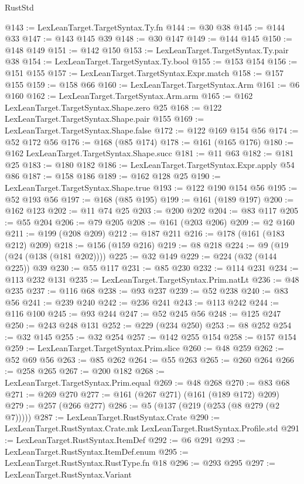 \begin{lexlean}{RustStd}
\begin{coremodule}
@143 := LexLeanTarget.TargetSyntax.Ty.fn
@144 := @30 @38
@145 := @144 @33
@147 := @143 @145 @39
@148 := @30 @147
@149 := @144 @145
@150 := @148 @149
@151 := @142 @150
@153 := LexLeanTarget.TargetSyntax.Ty.pair @38
@154 := LexLeanTarget.TargetSyntax.Ty.bool
@155 := @153 @154
@156 := @151 @155
@157 := LexLeanTarget.TargetSyntax.Expr.match
@158 := @157 @155
@159 := @158 @66
@160 := LexLeanTarget.TargetSyntax.Arm
@161 := @6 @160
@162 := LexLeanTarget.TargetSyntax.Arm.arm
@165 := @162 LexLeanTarget.TargetSyntax.Shape.zero @25
@168 := @122 LexLeanTarget.TargetSyntax.Shape.pair @155
@169 := LexLeanTarget.TargetSyntax.Shape.false
@172 := @122 @169 @154 @56
@174 := @52 @172 @56
@176 := @168 (@85 @174)
@178 := @161 (@165 @176)
@180 := @162 LexLeanTarget.TargetSyntax.Shape.succ
@181 := @11 @63
@182 := @181 @25
@183 := @180 @182
@186 := LexLeanTarget.TargetSyntax.Expr.apply @54 @86
@187 := @158 @186
@189 := @162 @128 @25
@190 := LexLeanTarget.TargetSyntax.Shape.true
@193 := @122 @190 @154 @56
@195 := @52 @193 @56
@197 := @168 (@85 @195)
@199 := @161 (@189 @197)
@200 := @162 @123
@202 := @11 @74 @25
@203 := @200 @202
@204 := @83 @117
@205 := @55 @204
@206 := @79 @205
@208 := @161 (@203 @206)
@209 := @2 @160
@211 := @199 (@208 @209)
@212 := @187 @211
@216 := @178 (@161 (@183 @212) @209)
@218 := @156 (@159 @216)
@219 := @8 @218
@224 := @9 (@19 (@24 (@138 (@181 @202))))
@225 := @32 @149
@229 := @224 (@32 (@144 @225)) @39
@230 := @55 @117
@231 := @85 @230
@232 := @114 @231
@234 := @113 @232 @131
@235 := LexLeanTarget.TargetSyntax.Prim.natLt
@236 := @48 @235
@237 := @116 @68
@238 := @93 @237
@239 := @52 @238
@240 := @83 @56
@241 := @239 @240
@242 := @236 @241
@243 := @113 @242
@244 := @116 @100
@245 := @93 @244
@247 := @52 @245 @56
@248 := @125 @247
@250 := @243 @248 @131
@252 := @229 (@234 @250)
@253 := @8 @252
@254 := @32 @145
@255 := @32 @254
@257 := @142 @255 @154
@258 := @157 @154
@259 := LexLeanTarget.TargetSyntax.Prim.slice
@260 := @48 @259
@262 := @52 @69 @56
@263 := @85 @262
@264 := @55 @263
@265 := @260 @264
@266 := @258 @265
@267 := @200 @182
@268 := LexLeanTarget.TargetSyntax.Prim.equal
@269 := @48 @268
@270 := @83 @68
@271 := @269 @270
@277 := @161 (@267 @271) (@161 (@189 @172) @209)
@279 := @257 (@266 @277)
@286 := @5 (@137 (@219 (@253 (@8 @279 (@2 @7)))))
@287 := LexLeanTarget.RustSyntax.Crate
@290 := LexLeanTarget.RustSyntax.Crate.mk LexLeanTarget.RustSyntax.Profile.std
@291 := LexLeanTarget.RustSyntax.ItemDef
@292 := @6 @291
@293 := LexLeanTarget.RustSyntax.ItemDef.enum
@295 := LexLeanTarget.RustSyntax.RustType.fn @18
@296 := @293 @295
@297 := LexLeanTarget.RustSyntax.Variant

\end{coremodule}
\end{lexlean}
